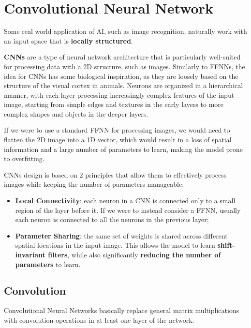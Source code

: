 \section{Convolutional Neural Network}
Some real world application of AI, such as image recognition, naturally work with an input space that is \textbf{locally structured}.

\textbf{CNNs} are a type of neural network architecture that is particularly well-suited for
processing data with a 2D structure, such as images.
Similarly to FFNNs, the idea for CNNs has some biological inspiration, as they are loosely based on the structure of the visual cortex in animals.
Neurons are organized in a hierarchical manner, with each layer processing increasingly complex features of the input image, starting from simple edges and 
textures in the early layers to more complex shapes and objects in the deeper layers.

If we were to use a standard FFNN for processing images, we would need to flatten the 2D image into a 1D vector, which would result in a loss
of spatial information and a large number of parameters to learn, making the model prone to overfitting.

CNNs design is based on 2 principles that allow them to effectively process images while keeping the number of parameters manageable:
\begin{itemize}
    \item \textbf{Local Connectivity}: each neuron in a CNN is connected only to a small region of the layer before it. If we were to instead
    consider a FFNN, usually each neuron is connected to all the neurons in the previous layer;
    \item \textbf{Parameter Sharing}: the same set of weights is shared across different spatial locations in the input image.
    This allows the model to learn \textbf{shift-invariant filters}, while also significantly \textbf{reducing the number of parameters} to learn.
\end{itemize}

\subsection{Convolution}
Convolutional Neural Networks basically replace general matrix multiplications with convolution operations in at least one layer of the network.

